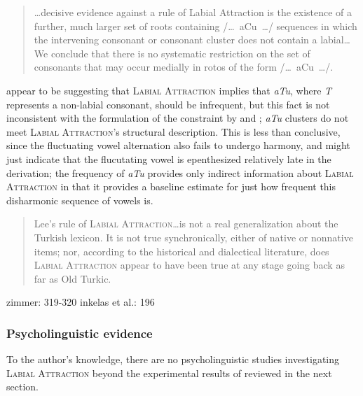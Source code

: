 \citet{Lees1966a}
\citet{Zimmer1969}

\begin{quote}
\ldots decisive evidence against a rule of Labial Attraction is the existence of a further, much larger set of roots containing /\ldots~aCu~\ldots/ sequences in which the intervening consonant or consonant cluster does not contain a labial\ldots We conclude that there is no systematic restriction on the set of consonants that may occur medially in rotos of the form /\ldots~aCu~\ldots/. \citep[][225]{Clements1982}
\end{quote}

\noindent
\citeauthor{Clements1982} appear to be suggesting that \textsc{Labial Attraction} implies that \emph{aTu}, where \emph{T} represents a non-labial consonant, should be infrequent, but this fact is not inconsistent with the formulation of the constraint by \citet{Lees1966a,Lees1966b} and \citet{Zimmer1969}; \emph{aTu} clusters do not meet \textsc{Labial Attraction}'s structural description. This is less than conclusive, since the fluctuating vowel alternation also fails to undergo harmony, and might just indicate that the flucutating vowel is epenthesized relatively late in the derivation; the frequency of \emph{aTu} provides only indirect information about \textsc{Labial Attraction} in that it provides a baseline estimate for just how frequent this disharmonic sequence of vowels is.

\citet{Inkelas1997}
\citet{Inkelas2001}

\begin{quote}
Lee's rule of \textsc{Labial Attraction}\ldots is not a real generalization about the Turkish lexicon. It is not true synchronically, either of native or nonnative items; nor, according to the historical and dialectical literature, does \textsc{Labial Attraction} appear to have been true at any stage going back as far as Old Turkic. \citep[][196]{Inkelas2001}
\end{quote}

zimmer: 319-320 
inkelas et al.: 196

\subsubsection{Psycholinguistic evidence}

To the author's knowledge, there are no psycholinguistic studies investigating \textsc{Labial Attraction} beyond the experimental results of \citet{Zimmer1969} reviewed in the next section. 
